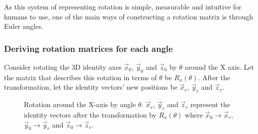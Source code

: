 \documentclass[12pt, a4paper]{article}
\begin{document}
As this system of representing rotation is simple, measurable and intuitive for
humans to use, one of the main ways of constructing a rotation matrix is through
Euler angles.

\pagebreak
\subsubsection{Deriving rotation matrices for each angle}
\label{section_deriving_rot_for_each_angle}
Consider rotating the 3D identity axes $\vec{x}_0$, $\vec{y}_0$ and $\vec{z}_0$
by $\theta$ around the X axis. Let the matrix that describes this rotation in
terms of $\theta$ be $R_x(\theta)$. After the transformation, let the identity
vectors' new positions be $\vec{x}_r$, $\vec{y}_r$ and $\vec{z}_r$. \\


\begin{figure}[H]
    \centering
    \caption{Rotation around the X-axis by angle $\theta$. $\vec{x}_r$,
        $\vec{y}_r$ and $\vec{z}_r$ represent the identity vectors after the
        transformation by $R_x(\theta)$ where $\vec{x}_0 \to \vec{x}_r$,
        $\vec{y}_0 \to \vec{y}_r$ and $\vec{z}_0 \to \vec{z}_r$.}
    \label{3d_euler_rot_x}
\end{figure}
\end{document}
